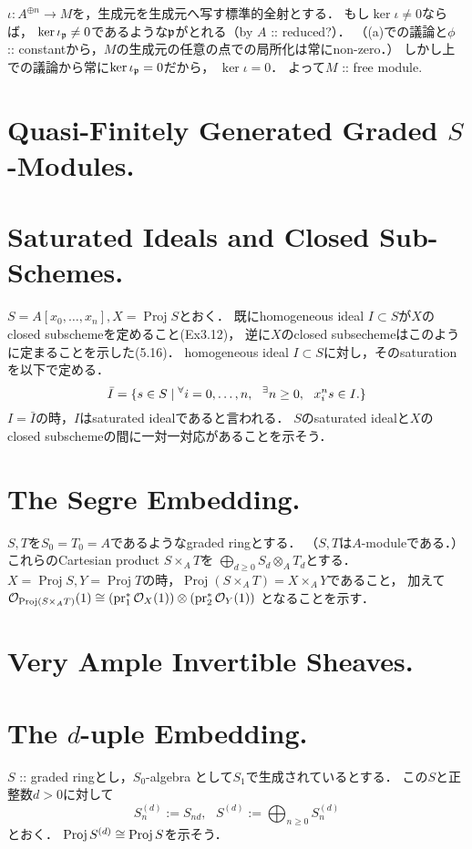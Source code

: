 \documentclass[a4paper]{jsarticle}
\newcommand{\shO}{\mathcal{O}}
\newcommand{\Proj}{\operatorname{Proj}}
\begin{document}
    $\iota: A^{\oplus n} \to M$を，生成元を生成元へ写す標準的全射とする．
    もし$\ker \iota \neq 0$ならば，
    $\ker \iota_{\mathfrak{p}} \neq 0$であるような$\mathfrak{p}$がとれる（by $A$ :: reduced?）．
    （(a)での議論と$\phi$ :: constantから，$M$の生成元の任意の点での局所化は常にnon-zero．）
    しかし上での議論から常に$\ker \iota_{\mathfrak{p}}=0$だから，
    $\ker \iota=0$．
    よって$M$ :: free module.

\section{Quasi-Finitely Generated Graded $S$-Modules.} %

\section{Saturated Ideals and Closed Sub-Schemes.} %
    $S=A[x_0,\dots,x_n], X=\Proj S$とおく．
    既にhomogeneous ideal $I \subset S$が$X$のclosed subschemeを定めること(Ex3.12)，
    逆に$X$のclosed subsechemeはこのように定まることを示した(5.16)．
    homogeneous ideal $I \subset S$に対し，そのsaturationを以下で定める．
    \[ \bar{I}=\{s \in S \mid {}^{\forall} i=0,\dots,n,~~ {}^{\exists} n \geq 0,~~ x_i^n s \in I. \} \]
    $I=\bar{I}$の時，$I$はsaturated idealであると言われる．
    $S$のsaturated idealと$X$のclosed subschemeの間に一対一対応があることを示そう．

\section{The Segre Embedding.} %
    $S,T$を$S_0=T_0=A$であるようなgraded ringとする．
    （$S,T$は$A$-moduleである．）
    これらのCartesian product $S \times_A T$を
    $\bigoplus_{d \geq 0} S_d \otimes_A T_d$とする．
    $X=\Proj S, Y=\Proj T$の時，$\Proj (S \times_A T)=X \times_A Y$であること，
    加えて$\shO_{\Proj (S \times_A T)}(1) \iso (\pr_1^*\shO_{X}(1)) \otimes (\pr_2^*\shO_Y(1))$
    となることを示す．

\section{Very Ample Invertible Sheaves.} %

\section{The $d$-uple Embedding.} %
    $S$ :: graded ringとし，$S_0$-algebra として$S_1$で生成されているとする．
    この$S$と正整数$d>0$に対して
    \[ S_n^{(d)}:=S_{nd},~~~ S^{(d)}:=\bigoplus_{n \geq 0} S_n^{(d)} \]
    とおく．
    $\Proj S^{(d)} \iso \Proj S$を示そう．
\end{document}
